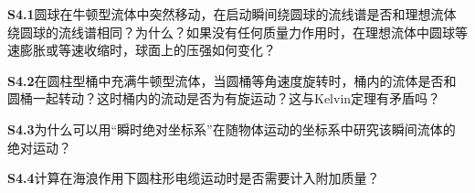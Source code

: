 \noindent\textbf{S4.1}\quad 圆球在牛顿型流体中突然移动，在启动瞬间绕圆球的流线谱是否和理想流体绕圆球的流线谱相同？为什么？如果没有任何质量力作用时，在理想流体中圆球等速膨胀或等速收缩时，球面上的压强如何变化？

\noindent\textbf{S4.2}\quad 在圆柱型桶中充满牛顿型流体，当圆桶等角速度旋转时，桶内的流体是否和圆桶一起转动？这时桶内的流动是否为有旋运动？这与Kelvin定理有矛盾吗？

\noindent\textbf{S4.3}\quad 为什么可以用“瞬时绝对坐标系”在随物体运动的坐标系中研究该瞬间流体的绝对运动？

\noindent\textbf{S4.4}\quad 计算在海浪作用下圆柱形电缆运动时是否需要计入附加质量？